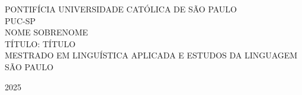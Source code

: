 
\begin{titlepage}
    \begin{center}
        {\large \MakeUppercase{Pontifícia Universidade Católica de São Paulo}} \\
        {\large \MakeUppercase{PUC-SP}} \\
        \vspace{5cm}
        {\large \MakeUppercase{Nome Sobrenome}} \\
        \vspace{5cm}
        {\Large \MakeUppercase{Título: título}} \\
        \vspace{5cm}
        {\large \MakeUppercase{Mestrado em Linguística Aplicada e Estudos da Linguagem}}
        \vfill
        {\large \MakeUppercase{São Paulo}}
        
        {\large 2025}
    \end{center}
\end{titlepage}

